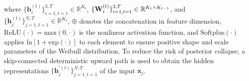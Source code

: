 \documentclass{article}
\newcommand{\Amat}[0]{\ensuremath{{\bf A}}}
\newcommand{\Wmat}[0]{\ensuremath{{\bf W}} }
\newcommand{\av}[0]{\ensuremath{\boldsymbol{a}} }
\newcommand{\bv}[0]{\ensuremath{\boldsymbol{b}} }
\newcommand{\dv}[0]{\ensuremath{\boldsymbol{d}} }
\newcommand{\hv}[0]{\ensuremath{\boldsymbol{h}} }
\newcommand{\kv}[0]{\ensuremath{\boldsymbol{k}} }
\newcommand{\xv}[0]{\ensuremath{\boldsymbol{x}} }
\newcommand{\lambdav}[0]{\ensuremath{\boldsymbol{\lambda}} }
\begin{document}
where $\{ \bv_i^{(t)} \}_{i=1,t=1}^{3,T} \in \mathbb{R}^{K_t} $, $\{ \Wmat_i^{(t)} \}_{i=1,t=1}^{3,T} \in \mathbb{R}^{K_t \times K_{t-1}} $, and $\{ \hv_j^{(t)} \}_{j=1,t=1}^{N,T} \in \mathbb{R}^{K_t} $, $\oplus$ denotes the concatenation in feature dimension, $\mbox{ReLU}(\cdot) = \mbox{max}(0, \cdot) $ is the nonlinear activation function, 
and $\mbox{Softplus}(\cdot) $ applies $\mbox{ln}[1 + \mbox{exp}(\cdot)] $ to each element to ensure positive shape and scale parameters of the Weibull distribution. To reduce the risk of posterior collapse, a skip-connected deterministic upward path \cite{duan2021sawtooth} is used to obtain the hidden representations
$\{ \hv_j^{'(t)} \}_{j=1,t=1}^{N,T} $ of the input $\bm{x}_j$. 
\end{document}
